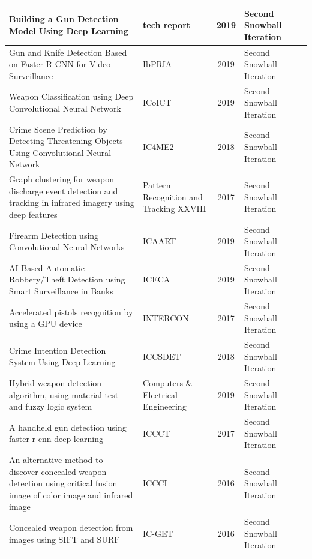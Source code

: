 {\begin{longtable}{|p{7.5cm}|p{2.5cm}|c|p{2cm}|p{2.2cm}|}
		\hline
		Building a Gun Detection Model Using Deep Learning & tech report & 2019 & Second Snowball Iteration & \cite{dubey16546building22}\\
		\hline
		Gun and Knife Detection Based on Faster R-CNN for Video Surveillance & IbPRIA & 2019 & Second Snowball Iteration & \cite{fernandez2019gun23}\\
		\hline
		Weapon Classification using Deep Convolutional Neural Network & ICoICT & 2019 & Second Snowball Iteration & \cite{dwivedi2019weapon24}\\
		\hline
		Crime Scene Prediction by Detecting Threatening Objects Using Convolutional Neural Network & IC4ME2 & 2018 & Second Snowball Iteration & \cite{nakib2018crime25}\\
		\hline
		Graph clustering for weapon discharge event detection and tracking in infrared imagery using deep features & Pattern Recognition and Tracking XXVIII & 2017 & Second Snowball Iteration & \cite{bhattacharjee2017graph26}\\
		\hline
		Firearm Detection using Convolutional Neural Networks & ICAART & 2019 & Second Snowball Iteration & \cite{de2019firearm27}\\
		\hline
		AI Based Automatic Robbery/Theft Detection using Smart Surveillance in Banks & ICECA & 2019 & Second Snowball Iteration & \cite{kakadiya2019ai28}\\
		\hline
		Accelerated pistols recognition by using a GPU device & INTERCON & 2017 & Second Snowball Iteration & \cite{martinez2017accelerated29}\\
		\hline
		Crime Intention Detection System Using Deep Learning & ICCSDET & 2018 & Second Snowball Iteration & \cite{navalgund2018crime30}\\
		\hline
		Hybrid weapon detection algorithm, using material test and fuzzy logic system & Computers \& Electrical Engineering & 2019 & Second Snowball Iteration & \cite{ineneji2019hybrid31}\\
		\hline
		A handheld gun detection using faster r-cnn deep learning & ICCCT & 2017 & Second Snowball Iteration & \cite{verma2017handheld32}\\
		\hline
		An alternative method to discover concealed weapon detection using critical fusion image of color image and infrared image & ICCCI & 2016 & Second Snowball Iteration & \cite{hussein2016alternative33}\\
		\hline
		Concealed weapon detection from images using SIFT and SURF & IC-GET & 2016 & Second Snowball Iteration & \cite{kaur2016concealed34}\\

\end{longtable}}
